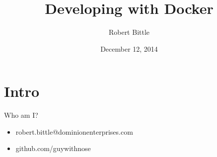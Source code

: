 \documentclass{beamer}
\title[Developing with Docker]{Developing with Docker}
\author{Robert Bittle}
\date{December 12, 2014}
\begin{document}
    \begin{frame}
    \titlepage
    \end{frame}


    \section{Intro}
    \begin{frame}{Who am I?}
        \begin{itemize}
            \item robert.bittle@dominionenterprises.com
            \item github.com/guywithnose
        \end{itemize}
    \end{frame}
\end{document}
